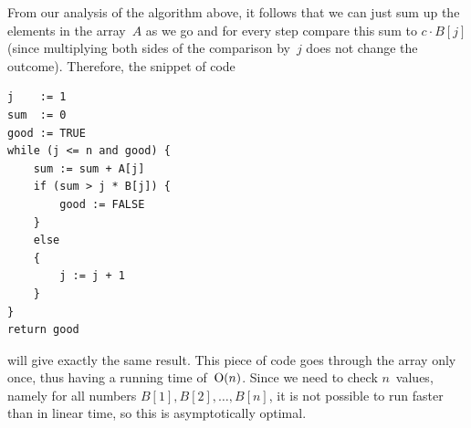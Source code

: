 \documentclass{jn-pset}
\begin{document}
\begin{problem}
\begin{solution}
  From our analysis of the algorithm above,
  it follows that we can just sum up the elements in the
  array~$A$ as we go and for every step compare
  this sum to $c \cdot B[j]$
  (since multiplying both sides of the comparison by~$j$ does not
  change the outcome).
  Therefore, the snippet of code
\begin{verbatim}
j    := 1
sum  := 0
good := TRUE
while (j <= n and good) {
    sum := sum + A[j]
    if (sum > j * B[j]) {
        good := FALSE
    }
    else
    {
        j := j + 1
    }
}
return good
\end{verbatim}
  will give exactly the same result.
  This piece of code goes through the array only once, thus having a
  running time of~$\mathrm{O} ( n )$.
  Since we need to check
  $n$~values, namely for all numbers
  $
  B[1],
  B[2],
  \ldots,
  B[n]
  $,
  it is not possible to run faster than in linear time, so this
  is asymptotically optimal.
\end{solution}

\end{problem}
\end{document}
